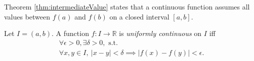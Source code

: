 \begin{rem}
Theorem \ref{thm:intermediateValue}
 states that a continuous function assumes
 all values between $f(a)$ and $f(b)$
 on a closed interval $[a,b]$.
\end{rem}

\begin{defn}
  \label{def:uniformlyContinuousScalar}
  Let $I=(a,b)$. A function $f: I\rightarrow \mathbb{R}$
  is \emph{uniformly continuous} on $I$
  iff
   \begin{equation}
     \label{eq:uniformlyContinuousScalar}
     \begin{array}{l}
     \forall \epsilon>0, \exists \delta>0,\text{ s.t. }
     \\
     \forall x,y\in I,\ 
     |x-y|<\delta \implies |f(x)-f(y)|<\epsilon.
     \end{array}
   \end{equation}
\end{defn}

